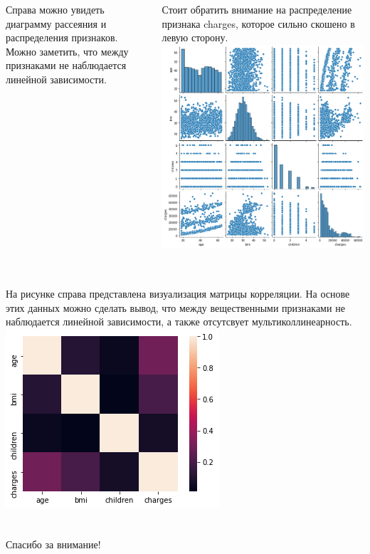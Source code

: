 \documentclass[c]{beamer}  %
\begin{document}
	\begin{frame}
		\frametitle{\insertsection}

		\begin{columns}[onlytextwidth,T]
			\justifying
			Справа можно увидеть диаграмму рассеяния и распределения признаков. Можно заметить, что между
			признаками не наблюдается линейной зависимости.
			
			Стоит обратить внимание на распределение признака charges, которое сильно
			скошено в левую сторону.
			\includegraphics[scale=0.2]{scatterplot.png}
		\end{columns}
	\end{frame}

	\begin{frame}
		\frametitle{\insertsection}

		\begin{columns}[onlytextwidth,T]
			\column{0.7\textwidth}
			\justifying
			На рисунке справа представлена визуализация матрицы корреляции. На основе этих данных можно
			сделать вывод, что между вещественными признаками не наблюдается линейной зависимости, а также
			отсутсвует мультиколлинеарность.
			\column{0.3\textwidth}
			\includegraphics[scale=0.35]{correlation_matrix.png}
		\end{columns}
	\end{frame}

	\begin{frame}
		\frametitle{\null}

		Спасибо за внимание!
	\end{frame}
\end{document}
